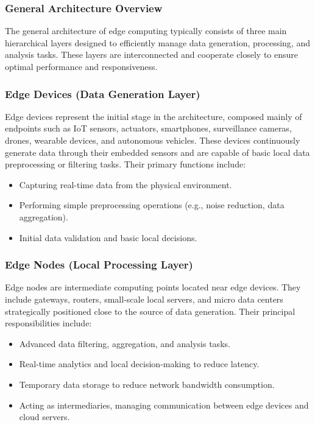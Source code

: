 \documentclass[runningheads]{llncs}
\begin{document}
\subsubsection{General Architecture Overview}
The general architecture of edge computing typically consists of three main hierarchical layers designed to efficiently manage data generation, processing, and analysis tasks. These layers are interconnected and cooperate closely to ensure optimal performance and responsiveness.


\subsubsection{Edge Devices (Data Generation Layer)}
Edge devices represent the initial stage in the architecture, composed mainly of endpoints such as IoT sensors, actuators, smartphones, surveillance cameras, drones, wearable devices, and autonomous vehicles. These devices continuously generate data through their embedded sensors and are capable of basic local data preprocessing or filtering tasks. Their primary functions include:
\begin{itemize}
    \item Capturing real-time data from the physical environment.
    \item Performing simple preprocessing operations (e.g., noise reduction, data aggregation).
    \item Initial data validation and basic local decisions.
\end{itemize}

\subsubsection{Edge Nodes (Local Processing Layer)}
Edge nodes are intermediate computing points located near edge devices. They include gateways, routers, small-scale local servers, and micro data centers strategically positioned close to the source of data generation. Their principal responsibilities include:
\begin{itemize}
    \item Advanced data filtering, aggregation, and analysis tasks.
    \item Real-time analytics and local decision-making to reduce latency.
    \item Temporary data storage to reduce network bandwidth consumption.
    \item Acting as intermediaries, managing communication between edge devices and cloud servers.
\end{itemize}
\end{document}
